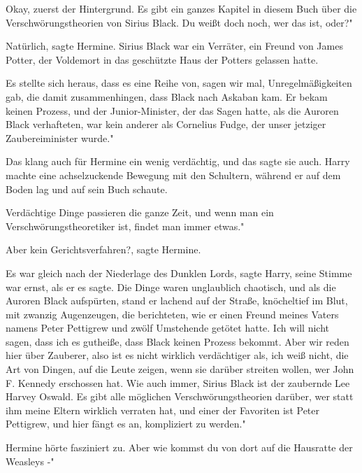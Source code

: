 \glqq{}Okay, zuerst der Hintergrund. Es gibt ein ganzes Kapitel in diesem Buch
über die Verschwörungstheorien von Sirius Black. Du weißt doch noch, wer das
ist, oder?"

\glqq{}Natürlich\grqq{}, sagte Hermine. Sirius Black war ein Verräter, ein Freund
von James Potter, der Voldemort in das geschützte Haus der Potters gelassen
hatte.

\glqq{}Es stellte sich heraus, dass es eine Reihe von, sagen wir mal,
Unregelmäßigkeiten gab, die damit zusammenhingen, dass Black nach Askaban kam.
Er bekam keinen Prozess, und der Junior-Minister, der das Sagen hatte, als die
Auroren Black verhafteten, war kein anderer als Cornelius Fudge, der unser
jetziger Zaubereiminister wurde."

Das klang auch für Hermine ein wenig verdächtig, und das sagte sie auch. Harry
machte eine achselzuckende Bewegung mit den Schultern, während er auf dem Boden
lag und auf sein Buch schaute.

\glqq{}Verdächtige Dinge passieren die ganze Zeit, und wenn man ein
Verschwörungstheoretiker ist, findet man immer etwas."

\glqq{}Aber kein Gerichtsverfahren?\grqq{}, sagte Hermine.

\glqq{}Es war gleich nach der Niederlage des Dunklen Lords\grqq{}, sagte Harry,
seine Stimme war ernst, als er es sagte. \glqq{}Die Dinge waren unglaublich
chaotisch, und als die Auroren Black aufspürten, stand er lachend auf der
Straße, knöcheltief im Blut, mit zwanzig Augenzeugen, die berichteten, wie er
einen Freund meines Vaters namens Peter Pettigrew und zwölf Umstehende getötet
hatte. Ich will nicht sagen, dass ich es gutheiße, dass Black keinen Prozess
bekommt. Aber wir reden hier über Zauberer, also ist es nicht wirklich
verdächtiger als, ich weiß nicht, die Art von Dingen, auf die Leute zeigen, wenn
sie darüber streiten wollen, wer John F. Kennedy erschossen hat. Wie auch immer,
Sirius Black ist der zaubernde Lee Harvey Oswald. Es gibt alle möglichen
Verschwörungstheorien darüber, wer statt ihm meine Eltern wirklich verraten hat,
und einer der Favoriten ist Peter Pettigrew, und hier fängt es an, kompliziert
zu werden."

Hermine hörte fasziniert zu. \glqq{}Aber wie kommst du von dort auf die Hausratte
der Weasleys -"

